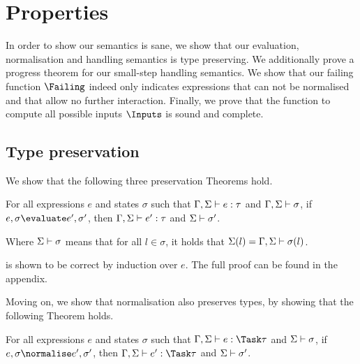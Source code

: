 


\section{Properties}
\label{sec:properties}




In order to show our semantics is sane, we show that our evaluation, normalisation
and handling semantics is type preserving. We additionally prove a progress
theorem for our small-step handling semantics.
We show that our failing function $\Failing$ indeed only indicates expressions
that can not be normalised and that allow no further interaction.
Finally, we prove that the function to compute all possible inputs $\Inputs$ is sound and complete.


\subsection{Type preservation}
\label{sub:preservation}

We show that the following three preservation Theorems hold.

\begin{theorem}
  For all expressions $e$ and states $\sigma$
  such that $\Gamma,\Sigma \vdash e:\tau$ and $\Gamma,\Sigma \vdash \sigma$,
  if $e,\sigma \evaluate e',\sigma'$,
  then $\Gamma,\Sigma \vdash e':\tau$ and $\Sigma \vdash \sigma'$.
  \label{thm:pres-eval}
\end{theorem}

Where $\Sigma \vdash \sigma$ means that for all $l\in \sigma$, it holds that
$\Sigma(l)=\Gamma,\Sigma\vdash \sigma(l)$.

 is shown to be correct by induction over $e$. The full
proof can be found in the appendix.


Moving on, we show that normalisation also preserves types, by showing that the following Theorem holds.

\begin{theorem}
  For all expressions $e$ and states $\sigma$
  such that $\Gamma,\Sigma \infers e:\Task\tau$ and $\Sigma \vdash \sigma$,
  if $e,\sigma \normalise e',\sigma'$,
  then $\Gamma,\Sigma \infers e':\Task\tau$ and $\Sigma \vdash \sigma'$.
  \label{thm:pres-norm}
\end{theorem}

